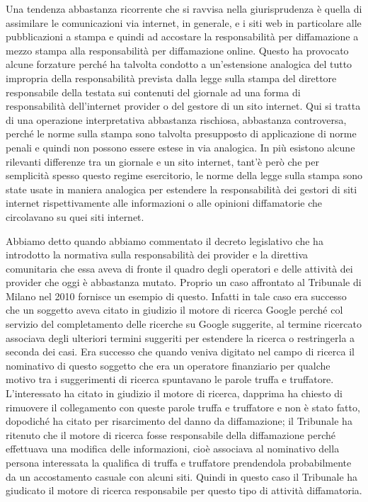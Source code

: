 Una tendenza abbastanza ricorrente che si ravvisa nella giurisprudenza è quella di assimilare le comunicazioni via internet, in generale, e i siti web in particolare alle pubblicazioni a stampa e quindi ad accostare la responsabilità per diffamazione a mezzo stampa alla responsabilità per diffamazione online.
Questo ha provocato alcune forzature perché ha talvolta condotto a un'estensione analogica del tutto impropria della responsabilità prevista dalla legge sulla stampa del direttore responsabile della testata sui contenuti del giornale ad una forma di responsabilità dell'internet provider o del gestore di un sito internet. Qui si tratta di una operazione interpretativa abbastanza rischiosa, abbastanza controversa, perché le norme sulla stampa sono talvolta presupposto di applicazione di norme penali e quindi non possono essere estese in via analogica. In più esistono alcune rilevanti differenze tra un giornale e un sito internet, tant'è però che per semplicità spesso questo regime esercitorio, le norme della legge sulla stampa sono state usate in maniera analogica per estendere la responsabilità dei gestori di siti internet rispettivamente alle informazioni o alle opinioni diffamatorie che circolavano su quei siti internet.

Abbiamo detto quando abbiamo commentato il decreto legislativo che ha introdotto la normativa sulla responsabilità dei provider e la direttiva comunitaria che essa aveva di fronte il quadro degli operatori e delle attività dei provider che oggi è abbastanza mutato. Proprio un caso affrontato al Tribunale di Milano nel 2010 fornisce un esempio di questo. Infatti in tale caso era successo che un soggetto aveva citato in giudizio il motore di ricerca Google perché col servizio del completamento delle ricerche su Google suggerite, al termine ricercato associava degli ulteriori termini suggeriti per estendere la ricerca o restringerla a seconda dei casi. Era successo che quando veniva digitato nel campo di ricerca il nominativo di questo soggetto che era un operatore finanziario per qualche motivo tra i suggerimenti di ricerca spuntavano le parole truffa e truffatore. L'interessato ha citato in giudizio il motore di ricerca, dapprima ha chiesto di rimuovere il collegamento con queste parole truffa e truffatore e non è stato fatto, dopodiché ha citato per risarcimento del danno da diffamazione; il Tribunale ha ritenuto che il motore di ricerca fosse responsabile della diffamazione perché effettuava una modifica delle informazioni, cioè associava al nominativo della persona interessata la qualifica di truffa e truffatore prendendola probabilmente da un accostamento casuale con alcuni siti. Quindi in questo caso il Tribunale ha giudicato il motore di ricerca responsabile per questo tipo di attività diffamatoria. 


